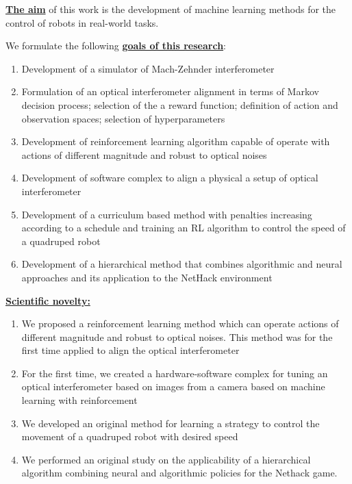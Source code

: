 \underline{\textbf{The aim}} of this work is the development of machine learning methods for the control of robots in real-world tasks.

We formulate the following \underline{\textbf{goals of this research}}:
\begin{enumerate}[beginpenalty=10000] %
  \item Development of a simulator of Mach-Zehnder interferometer
  \item Formulation of an optical interferometer alignment in terms of Markov decision process; selection of the a reward function; definition of action and observation spaces; selection of hyperparameters
  \item Development of reinforcement learning algorithm capable of operate with actions of different magnitude and robust to optical noises
  \item Development of software complex to align a physical a setup of optical interferometer
  \item Development of a curriculum based method with penalties increasing according to a schedule and training an RL algorithm to control the speed of a quadruped robot
  \item Development of a hierarchical method that combines algorithmic and neural approaches and its application to the NetHack environment
\end{enumerate}


\underline{\textbf{Scientific novelty:}}
\begin{enumerate}[beginpenalty=10000] %
  \item We proposed a reinforcement learning method which can operate actions of different magnitude and robust to optical noises. This method was for the first time applied to align the optical interferometer
  \item For the first time, we created a hardware-software complex for tuning an optical interferometer based on images from a camera based on machine learning with reinforcement
  \item We developed an original method for learning a strategy to control the movement of a quadruped robot with desired speed
  \item We performed an original study on the applicability of a hierarchical algorithm combining neural and algorithmic policies for the Nethack game.
\end{enumerate}

